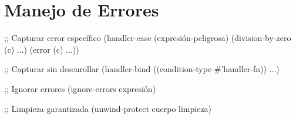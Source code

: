 \section*{Manejo de Errores}

\begin{lispcode}
;; Capturar error específico
(handler-case
    (expresión-peligrosa)
  (division-by-zero (c) ...)
  (error (c) ...))

;; Capturar sin desenrollar
(handler-bind
    ((condition-type #'handler-fn))
  ...)

;; Ignorar errores
(ignore-errors expresión)

;; Limpieza garantizada
(unwind-protect cuerpo limpieza)
\end{lispcode}

